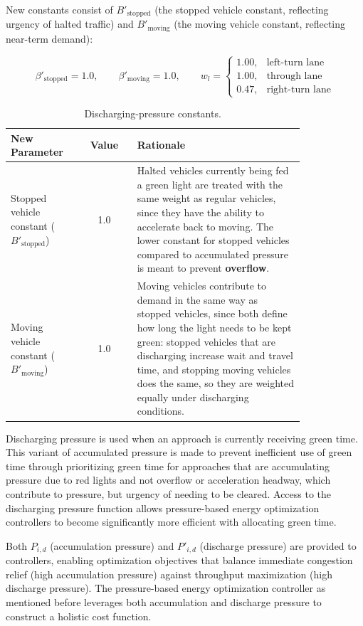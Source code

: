 \documentclass[12pt]{article}
\begin{document}
New constants consist of \({B'}_{\text{stopped}}\) (the stopped vehicle constant, reflecting urgency of halted traffic) and \({B'}_{\text{moving}}\) (the moving vehicle constant, reflecting near-term demand):

\[
\beta'_{\text{stopped}} = 1.0, \qquad \beta'_{\text{moving}} = 1.0, \qquad w_l = \begin{cases} 1.00, & \text{left-turn lane} \\ 1.00, & \text{through lane} \\ 0.47, & \text{right-turn lane} \end{cases}
\]


\begin{table}[H]
\centering
\begin{tabular}{@{} p{0.24\linewidth} c p{0.58\linewidth} @{}}
\toprule
\textbf{New Parameter} & \textbf{Value} & \textbf{Rationale} \\
\midrule
Stopped vehicle constant ($B'_{\text{stopped}}$) & 1.0 &
Halted vehicles currently being fed a green light are treated with the same weight as regular vehicles, since they have the ability to accelerate back to moving. The lower constant for stopped vehicles compared to accumulated pressure is meant to prevent \textbf{overflow}. \\
Moving vehicle constant ($B'_{\text{moving}}$) & 1.0 &
Moving vehicles contribute to demand in the same way as stopped vehicles, since both define how long the light needs to be kept green: stopped vehicles that are discharging increase wait and travel time, and stopping moving vehicles does the same, so they are weighted equally under discharging conditions. \\
\bottomrule
\end{tabular}
\caption{Discharging-pressure constants.}
\label{tab:discharging-constants}
\end{table}


Discharging pressure is used when an approach is currently receiving green time. This variant of accumulated pressure is made to prevent inefficient use of green time through prioritizing green time for approaches that are accumulating pressure due to red lights and not overflow or acceleration headway, which contribute to pressure, but urgency of needing to be cleared. Access to the discharging pressure function allows pressure-based energy optimization controllers to become significantly more efficient with allocating green time.

Both $P_{i,d}$ (accumulation pressure) and $P'_{i,d}$ (discharge pressure) are provided to controllers, enabling optimization objectives that balance immediate congestion relief (high accumulation pressure) against throughput maximization (high discharge pressure). The pressure-based energy optimization controller as mentioned before leverages both accumulation and discharge pressure to construct a holistic cost function.
\end{document}
